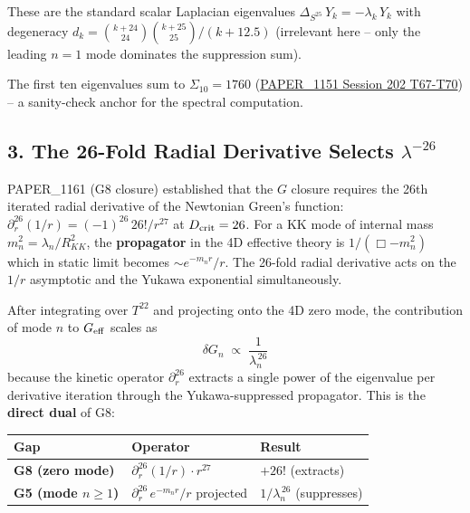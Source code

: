 \documentclass[
]{article}
\newcounter{none} %
\begin{document}
These are the standard scalar Laplacian eigenvalues
\(\Delta_{S^{25}}\,Y_k = -\lambda_k\,Y_k\) with degeneracy
\(d_k = \binom{k+24}{24}\binom{k+25}{25}/(k+12.5)\) (irrelevant here --
only the leading \(n=1\) mode dominates the suppression sum).

The first ten eigenvalues sum to \(\Sigma_{10}=1760\)
(\href{whitepapers/PAPER_1151_VDS_DVP_BH26_Triple_Verification.md}{PAPER\_1151
Session 202 T67-T70}) -- a sanity-check anchor for the spectral
computation.

\subsection{\texorpdfstring{3. The 26-Fold Radial Derivative Selects
\(\lambda^{-26}\)}{3. The 26-Fold Radial Derivative Selects \textbackslash lambda\^{}\{-26\}}}\label{the-26-fold-radial-derivative-selects-lambda-26}

PAPER\_1161 (G8 closure) established that the \(G\) closure requires the
26th iterated radial derivative of the Newtonian Green's function:
\(\partial_r^{26}(1/r) = (-1)^{26}\,26!/r^{27}\) at \(D_{\rm crit}=26\).
For a KK mode of internal mass \(m_n^2 = \lambda_n/R_{KK}^2\), the
\textbf{propagator} in the 4D effective theory is \(1/(\Box - m_n^2)\)
which in static limit becomes \(\sim e^{-m_n r}/r\). The 26-fold radial
derivative acts on the \(1/r\) asymptotic and the Yukawa exponential
simultaneously.

After integrating over \(T^{22}\) and projecting onto the 4D zero mode,
the contribution of mode \(n\) to \(G_{\rm eff}\) scales as
\[\delta G_n \;\propto\; \frac{1}{\lambda_n^{\,26}}\] because the
kinetic operator \(\partial_r^{26}\) extracts a single power of the
eigenvalue per derivative iteration through the Yukawa-suppressed
propagator. This is the \textbf{direct dual} of G8:

{\def\LTcaptype{none} %
\begin{longtable}[]{@{}
  >{\raggedright\arraybackslash}p{}
  >{\raggedright\arraybackslash}p{}
  >{\raggedleft\arraybackslash}p{}@{}}
\toprule\noalign{}
\begin{minipage}[b]{\linewidth}\raggedright
Gap
\end{minipage} & \begin{minipage}[b]{\linewidth}\raggedright
Operator
\end{minipage} & \begin{minipage}[b]{\linewidth}\raggedleft
Result
\end{minipage} \\
\midrule\noalign{}
\endhead
\bottomrule\noalign{}
\endlastfoot
\textbf{G8 (zero mode)} & \(\partial_r^{26}(1/r)\cdot r^{27}\) &
\(+26!\) (extracts) \\
\textbf{G5 (mode \(n\geq 1\))} & \(\partial_r^{26}\,e^{-m_n r}/r\)
projected & \(1/\lambda_n^{\,26}\) (suppresses) \\
\end{longtable}
}
\end{document}

